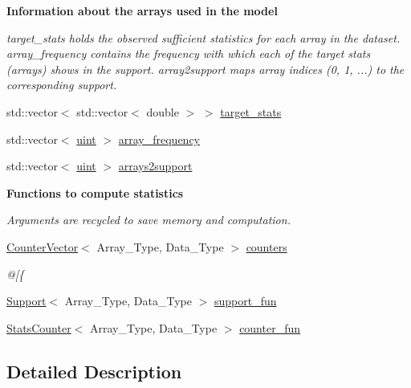 \begin{Indent}\textbf{ Information about the arrays used in the model}\par
{\em {\ttfamily target\+\_\+stats} holds the observed sufficient statistics for each array in the dataset. {\ttfamily array\+\_\+frequency} contains the frequency with which each of the target stats (arrays) shows in the support. {\ttfamily array2support} maps array indices (0, 1, ...) to the corresponding support. }\begin{DoxyCompactItemize}
\item 
std\+::vector$<$ std\+::vector$<$ double $>$ $>$ \hyperlink{class_model_ab0f4642a2d4602fabb6774914b7dbd39}{target\+\_\+stats}
\item 
std\+::vector$<$ \hyperlink{typedefs_8hpp_a91ad9478d81a7aaf2593e8d9c3d06a14}{uint} $>$ \hyperlink{class_model_a55b4255d2514b1b22a0fb7361187fead}{array\+\_\+frequency}
\item 
std\+::vector$<$ \hyperlink{typedefs_8hpp_a91ad9478d81a7aaf2593e8d9c3d06a14}{uint} $>$ \hyperlink{class_model_a880b9e2535fcdaea9cc60d4dbdc7bcbc}{arrays2support}
\end{DoxyCompactItemize}
\end{Indent}
\begin{Indent}\textbf{ Functions to compute statistics}\par
{\em Arguments are recycled to save memory and computation. }\begin{DoxyCompactItemize}
\item 
\hyperlink{class_counter_vector}{Counter\+Vector}$<$ Array\+\_\+\+Type, Data\+\_\+\+Type $>$ \hyperlink{class_model_a1a711382ab0593f3b54ad549746e9149}{counters}
\begin{DoxyCompactList}\small\item\em @\mbox{[}\{ \end{DoxyCompactList}\item 
\hyperlink{class_support}{Support}$<$ Array\+\_\+\+Type, Data\+\_\+\+Type $>$ \hyperlink{class_model_a192302b6d7402bd4ef6edae623074ad0}{support\+\_\+fun}
\item 
\hyperlink{class_stats_counter}{Stats\+Counter}$<$ Array\+\_\+\+Type, Data\+\_\+\+Type $>$ \hyperlink{class_model_a126cffe699d64e664ba6aa0b1796c780}{counter\+\_\+fun}
\end{DoxyCompactItemize}
\end{Indent}


\subsection{Detailed Description}
